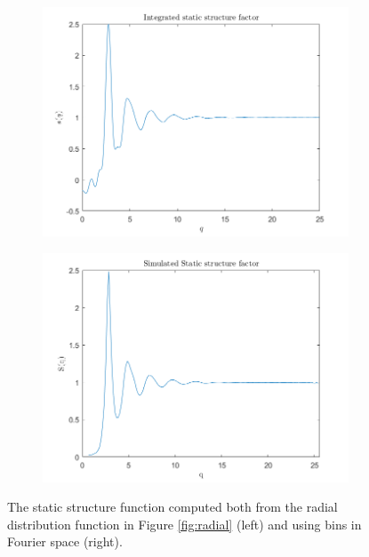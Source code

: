 \begin{figure}[H]
    \centering
    \captionsetup[subfigure]{justification=centering}
    \begin{subfigure}[b]{0.40\textwidth}
        \centering
        \includegraphics[width=\textwidth]{graphics/task8/integral.png}
    \end{subfigure}
    \begin{subfigure}[b]{0.40\textwidth}
        \centering
        \includegraphics[width=\textwidth]{graphics/task8/simulated.png}
    \end{subfigure}
    \caption{The static structure function computed both from the radial distribution function in Figure \ref{fig:radial} (left) and using bins in Fourier space (right).}
    \label{fig:StaticStructure}
\end{figure}




